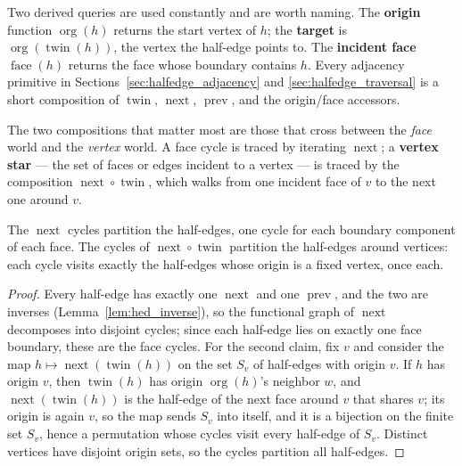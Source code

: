 Two derived queries are used constantly and are worth naming. The
\textbf{origin} function $\operatorname{org}(h)$
returns the start vertex of $h$; the \textbf{target}
is $\operatorname{org}(\operatorname{twin}(h))$, the vertex the half-edge
points to. The \textbf{incident face}
$\operatorname{face}(h)$ returns the face whose boundary contains $h$. Every
adjacency primitive in Sections~\ref{sec:halfedge_adjacency} and
\ref{sec:halfedge_traversal} is a short composition of
$\operatorname{twin}$, $\operatorname{next}$, $\operatorname{prev}$, and the
origin/face accessors.

The two compositions that matter most are those that cross between the
\emph{face} world and the \emph{vertex} world. A face cycle is traced by
iterating $\operatorname{next}$; a \textbf{vertex star}
--- the set of faces or edges incident to a vertex --- is traced by the
composition $\operatorname{next} \circ \operatorname{twin}$, which walks
from one incident face of $v$ to the next one around $v$.

\begin{theorem}\label{thm:hed_cycles}
The $\operatorname{next}$ cycles partition the half-edges, one cycle for
each boundary component of each face. The cycles of
$\operatorname{next} \circ \operatorname{twin}$ partition the half-edges
around vertices: each cycle visits exactly the half-edges whose origin is
a fixed vertex, once each.
\end{theorem}

\begin{proof}
Every half-edge has exactly one $\operatorname{next}$ and one
$\operatorname{prev}$, and the two are inverses
(Lemma~\ref{lem:hed_inverse}), so the functional graph of
$\operatorname{next}$ decomposes into disjoint cycles; since each half-edge
lies on exactly one face boundary, these are the face cycles. For the
second claim, fix $v$ and consider the map $h \mapsto
\operatorname{next}(\operatorname{twin}(h))$ on the set $S_v$ of half-edges
with origin $v$. If $h$ has origin $v$, then $\operatorname{twin}(h)$ has
origin $\operatorname{org}(h)$'s neighbor $w$, and
$\operatorname{next}(\operatorname{twin}(h))$ is the half-edge of the next
face around $v$ that shares $v$; its origin is again $v$, so the map sends
$S_v$ into itself, and it is a bijection on the finite set $S_v$, hence a
permutation whose cycles visit every half-edge of $S_v$. Distinct vertices
have disjoint origin sets, so the cycles partition all half-edges.
\end{proof}


